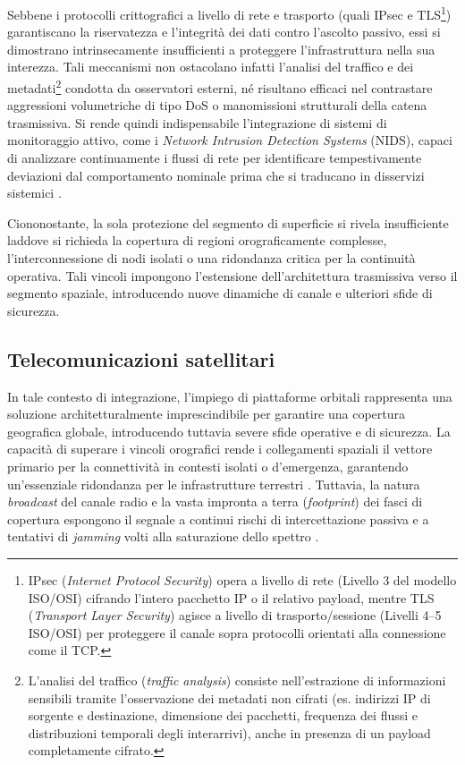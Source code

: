Sebbene i protocolli crittografici a livello di rete e trasporto (quali IPsec e TLS\footnote{IPsec (\textit{Internet Protocol Security}) opera a livello di rete (Livello 3 del modello ISO/OSI) cifrando l'intero pacchetto IP o il relativo payload, mentre TLS (\textit{Transport Layer Security}) agisce a livello di trasporto/sessione (Livelli 4--5 ISO/OSI) per proteggere il canale sopra protocolli orientati alla connessione come il TCP.}) garantiscano la riservatezza e l'integrità dei dati contro l'ascolto passivo, essi si dimostrano intrinsecamente insufficienti a proteggere l'infrastruttura nella sua interezza. 
Tali meccanismi non ostacolano infatti l'analisi del traffico e dei metadati\footnote{L'analisi del traffico (\textit{traffic analysis}) consiste nell'estrazione di informazioni sensibili tramite l'osservazione dei metadati non cifrati (es. indirizzi IP di sorgente e destinazione, dimensione dei pacchetti, frequenza dei flussi e distribuzioni temporali degli interarrivi), anche in presenza di un payload completamente cifrato.} condotta da osservatori esterni, né risultano efficaci nel contrastare aggressioni volumetriche di tipo DoS o manomissioni strutturali della catena trasmissiva. 
Si rende quindi indispensabile l'integrazione di sistemi di monitoraggio attivo, come i \textit{Network Intrusion Detection Systems} (NIDS), capaci di analizzare continuamente i flussi di rete per identificare tempestivamente deviazioni dal comportamento nominale prima che si traducano in disservizi sistemici \cite{khraisat2019}.

Ciononostante, la sola protezione del segmento di superficie si rivela insufficiente laddove si richieda la copertura di regioni orograficamente complesse, l'interconnessione di nodi isolati o una ridondanza critica per la continuità operativa. 
Tali vincoli impongono l'estensione dell'architettura trasmissiva verso il segmento spaziale, introducendo nuove dinamiche di canale e ulteriori sfide di sicurezza.

\subsection{Telecomunicazioni satellitari}
\label{subsec:telecomunicazioni_satellitari}

In tale contesto di integrazione, l'impiego di piattaforme orbitali rappresenta una soluzione architetturalmente imprescindibile per garantire una copertura geografica globale, introducendo tuttavia severe sfide operative e di sicurezza. 
La capacità di superare i vincoli orografici rende i collegamenti spaziali il vettore primario per la connettività in contesti isolati o d'emergenza, garantendo un'essenziale ridondanza per le infrastrutture terrestri \cite{kodheli2021}. 
Tuttavia, la natura \textit{broadcast} del canale radio e la vasta impronta a terra (\textit{footprint}) dei fasci di copertura espongono il segnale a continui rischi di intercettazione passiva e a tentativi di \textit{jamming} volti alla saturazione dello spettro \cite{nist2022}.

